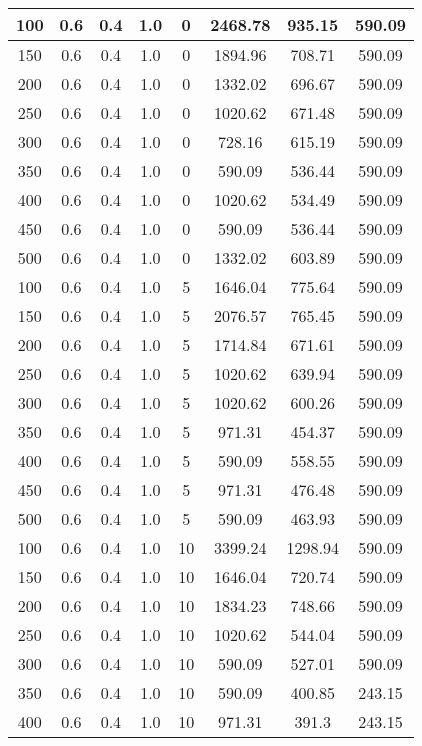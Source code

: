 \documentclass[a4paper, 12pt]{extreport}
\begin{document}
\begin{itemize}
\begin{longtable}{|c|c|c|c|c|c|c|c|}
			100 & 0.6 & 0.4 & 1.0 & 0 & 2468.78 & 935.15 & 590.09 \\\hline
			150 & 0.6 & 0.4 & 1.0 & 0 & 1894.96 & 708.71 & 590.09 \\\hline
			200 & 0.6 & 0.4 & 1.0 & 0 & 1332.02 & 696.67 & 590.09 \\\hline
			250 & 0.6 & 0.4 & 1.0 & 0 & 1020.62 & 671.48 & 590.09 \\\hline
			300 & 0.6 & 0.4 & 1.0 & 0 & 728.16 & 615.19 & 590.09 \\\hline
			350 & 0.6 & 0.4 & 1.0 & 0 & 590.09 & 536.44 & 590.09 \\\hline
			400 & 0.6 & 0.4 & 1.0 & 0 & 1020.62 & 534.49 & 590.09 \\\hline
			450 & 0.6 & 0.4 & 1.0 & 0 & 590.09 & 536.44 & 590.09 \\\hline
			500 & 0.6 & 0.4 & 1.0 & 0 & 1332.02 & 603.89 & 590.09 \\\hline
			100 & 0.6 & 0.4 & 1.0 & 5 & 1646.04 & 775.64 & 590.09 \\\hline
			150 & 0.6 & 0.4 & 1.0 & 5 & 2076.57 & 765.45 & 590.09 \\\hline
			200 & 0.6 & 0.4 & 1.0 & 5 & 1714.84 & 671.61 & 590.09 \\\hline
			250 & 0.6 & 0.4 & 1.0 & 5 & 1020.62 & 639.94 & 590.09 \\\hline
			300 & 0.6 & 0.4 & 1.0 & 5 & 1020.62 & 600.26 & 590.09 \\\hline
			350 & 0.6 & 0.4 & 1.0 & 5 & 971.31 & 454.37 & 590.09 \\\hline
			400 & 0.6 & 0.4 & 1.0 & 5 & 590.09 & 558.55 & 590.09 \\\hline
			450 & 0.6 & 0.4 & 1.0 & 5 & 971.31 & 476.48 & 590.09 \\\hline
			500 & 0.6 & 0.4 & 1.0 & 5 & 590.09 & 463.93 & 590.09 \\\hline
			100 & 0.6 & 0.4 & 1.0 & 10 & 3399.24 & 1298.94 & 590.09 \\\hline
			150 & 0.6 & 0.4 & 1.0 & 10 & 1646.04 & 720.74 & 590.09 \\\hline
			200 & 0.6 & 0.4 & 1.0 & 10 & 1834.23 & 748.66 & 590.09 \\\hline
			250 & 0.6 & 0.4 & 1.0 & 10 & 1020.62 & 544.04 & 590.09 \\\hline
			300 & 0.6 & 0.4 & 1.0 & 10 & 590.09 & 527.01 & 590.09 \\\hline
			350 & 0.6 & 0.4 & 1.0 & 10 & 590.09 & 400.85 & 243.15 \\\hline
			400 & 0.6 & 0.4 & 1.0 & 10 & 971.31 & 391.3 & 243.15 \\\hline

\end{longtable}
\end{itemize}
\end{document}
